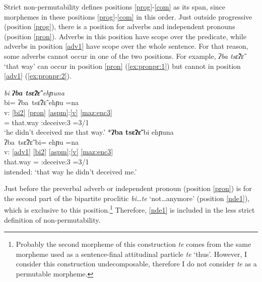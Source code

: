 \documentclass[output=paper]{langscibook}
\begin{document}
Strict non-permutability defines positions \ref{prog}-\ref{com} as its span, since morphemes in these positions \ref{prog}-\ref{com} in this order.
Just outside progressive (position \ref{prog}), there is a position for adverbs and independent pronouns (position \ref{pron}). Adverbs in this position have scope over the predicate, while adverbs in position \ref{adv1} have scope over the whole sentence. For that reason, some adverbs cannot occur in one of the two positions. For example, \textit{ʔba\1 tsɛ̃\2ʔɛ̃\3} `that way' can occur in position \ref{pron} (\ref{ex:pronpr:1}) but cannot in position \ref{adv1} (\ref{ex:pronpr:2}).

\ea 
\ea \label{ex:pronpr:1}
\textit{bi\4 \textbf{ʔba\1 tsɛ̃\2\st{}ʔɛ̃\3} e\2\st{}hɲu\4na\1}\\
\glll {} bi\4= ʔba\1~tsɛ̃\2ʔɛ̃\3\ff{} e\2hɲu\4 =na\1 \\
v: \ref{bi2} \ref{pron}  \ref{aspm}:\ref{v} \ref{maz:enc3}\\
{} \Neg= that.way \Pfv:deceive:3 =3/1\Sg\\
\glt `he didn't deceived me that way.'
\ex \label{ex:pronpr:2}
*\textbf{ʔba\1 tsɛ̃\2\st{}ʔɛ̃\3} bi\4 e\2\st{}hɲu\4na\1\\
\glll {} ʔba\1~tsɛ̃\2ʔɛ̃\3\ff{} bi\4= e\2hɲu\4 =na\1 \\
v: \ref{adv1} \ref{bi2}  \ref{aspm}:\ref{v} \ref{maz:enc3}\\
{} that.way  \Neg= \Pfv:deceive:3 =3/1\Sg\\
\glt intended: `that way he didn't deceived me.'
\z
\z


Just before the preverbal adverb or independent pronoun (position \ref{pron}) is for the second part of the bipartite proclitic \textit{bi\4\ldots\ssn{}te\1} `not\ldots{}anymore' (position \ref{nde1}), which is exclusive to this position.\footnote{Probably the second morpheme of this construction \textit{\ssn{}te\1} comes from the same morpheme used as a sentence-final attitudinal particle \textit{\ssn{}te\1} `thus'. However, I consider this construction undecomposable, therefore I do not consider \textit{\ssn{}te\1} as a permutable morpheme.} Therefore, \ref{nde1} is included in the less strict definition of non-permutability.
\end{document}
